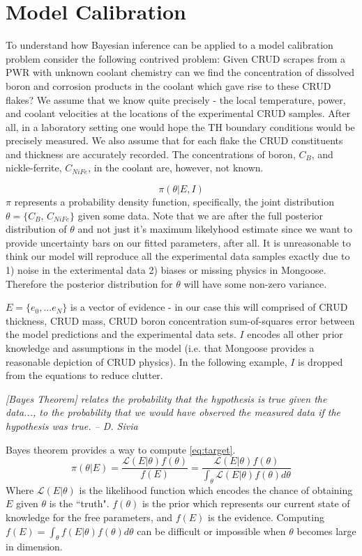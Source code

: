 \documentclass[10pt,a4paper]{report}
\begin{document}
\chapter{Model Calibration}

To understand how Bayesian inference can be applied to a model calibration problem consider the following contrived problem:  Given CRUD scrapes from a PWR with unknown coolant chemistry can we find the concentration of dissolved boron and corrosion products in the coolant which gave rise to these CRUD flakes?  We assume that we know quite precisely - the local temperature, power, and coolant velocities at the locations of the experimental CRUD samples. After all, in a laboratory setting one would hope the TH boundary conditions would be precisely measured.  We also assume that for each flake the CRUD constituents and thickness are accurately recorded.  The concentrations of boron, $C_{B}$, and nickle-ferrite,  $C_{NiFe}$, in the coolant are, however, not known.

\begin{equation}
\pi(\theta| E, I)
\label{eq:target}
\end{equation}
$\pi$ represents a probability density function, specifically, the joint distribution $\theta = \{C_{B}$, $C_{NiFe}\}$ given some data.  Note that we are after the full posterior distribution of $\theta$ and not just it's maximum likelyhood estimate since we want to provide uncertainty bars on our fitted parameters, after all.  It is unreasonable to think our model will reproduce all the experimental data samples exactly due to 1) noise in the exterimental data 2) biases or missing physics in Mongoose.  Therefore the posterior distribution for $\theta$ will have some non-zero variance.

$E=\{e_0, ... e_N\}$ is a vector of evidence - in our case this will comprised of CRUD thickness, CRUD mass, CRUD boron concentration sum-of-squares error between the model predictions and the experimental data sets. $I$ encodes all other prior knowledge and assumptions in the model (i.e. that Mongoose provides a reasonable depiction of CRUD physics).  In the following example, $I$ is dropped from the equations to reduce clutter.

\emph{[Bayes Theorem] relates the probability that the hypothesis is true given the data..., to the probability that we would have observed the measured data if the hypothesis was true. -- D. Sivia}

Bayes theorem provides a way to compute \ref{eq:target}.
\begin{equation}
    \pi(\theta| E) = \frac{\mathcal{L}(E|\theta)f(\theta)}{f(E)} = \frac{\mathcal{L}(E|\theta)f(\theta)}{\int_\theta \mathcal{L}(E|\theta) f(\theta)d\theta}
\end{equation}
Where $\mathcal{L}(E|\theta)$ is the likelihood function which encodes the chance of obtaining $E$ given $\theta$ is the ``truth". $f(\theta)$ is the prior which represents our current state of knowledge for the free parameters, and $f(E)$ is the evidence.
Computing $f(E)= \int_\theta f(E|\theta) f(\theta)d\theta$ can be difficult or impossible when $\theta$ becomes large in dimension.
\end{document}
